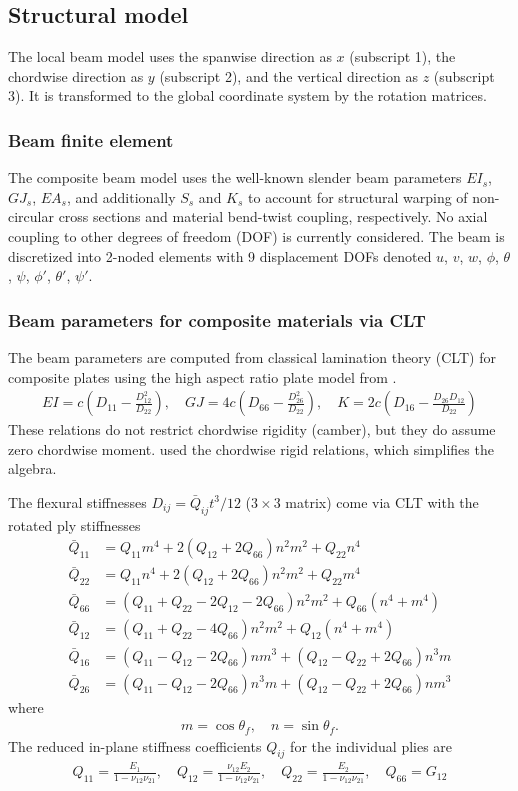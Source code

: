 \documentclass[10pt]{article}
\newcommand{\be}{\begin{eqnarray}}
\newcommand{\ee}{\end{eqnarray}}
\begin{document}
\subsection{Structural model}
% 
The local beam model uses the spanwise direction as $x$ (subscript 1), the chordwise direction as $y$ (subscript 2), and the vertical direction as $z$ (subscript 3).
It is transformed to the global coordinate system by the rotation matrices.
\subsubsection{Beam finite element}
% 
The composite beam model uses the well-known slender beam parameters $EI_s$, $GJ_s$, $EA_s$, and additionally $S_s$ and $K_s$ to account for structural warping of non-circular cross sections and material bend-twist coupling, respectively.
No axial coupling to other degrees of freedom (DOF) is currently considered.
The beam is discretized into 2-noded elements with 9 displacement DOFs denoted $u$, $v$, $w$, $\phi$, $\theta$, $\psi$, $\phi'$, $\theta'$, $\psi'$.
% 
\subsubsection{Beam parameters for composite materials via CLT}
% 
The beam parameters are computed from classical lamination theory (CLT) for composite plates using the high aspect ratio plate model from \citet{Weisshaar1985}.
\be
EI = c\left( D_{11} - \frac{D_{12}^2}{D_{22}}\right)      , \quad
GJ = 4c \left(D_{66} - \frac{D_{26}^2}{D_{22}}\right)     , \quad
K  = 2c \left(D_{16} - \frac{D_{26}D_{12}}{D_{22}}\right)
\ee
These relations do not restrict chordwise rigidity (camber), but they do assume zero chordwise moment.
\citet{LOTTATI1985} used the chordwise rigid relations, which simplifies the algebra.

The flexural stiffnesses $D_{ij} = \bar{Q}_{ij} t^3 / 12$ ($3\times3$ matrix) come via CLT with the rotated ply stiffnesses
\begin{align}
	\bar{Q}_{11} & = Q_{11}m^4 + 2\left( Q_{12}+2Q_{66}\right)n^2m^2 + Q_{22}n^4                               \\
	\bar{Q}_{22} & = Q_{11}n^4+2\left( Q_{12} + 2Q_{66}\right)n^2m^2 + Q_{22}m^4                               \\
	\bar{Q}_{66} & = \left(Q_{11} +Q_{22} - 2Q_{12}-2Q_{66}\right)n^2m^2 + Q_{66}\left( n^4 + m^4 \right)      \\
	\bar{Q}_{12} & = \left(Q_{11} +Q_{22} - 4Q_{66}\right)n^2 m^2 + Q_{12}\left( n^4 + m^4 \right)             \\
	\bar{Q}_{16} & = \left(Q_{11} - Q_{12} - 2Q_{66}\right)n m^3 + \left(Q_{12} - Q_{22} + 2Q_{66}\right) n^3 m \\
	\bar{Q}_{26} & = \left(Q_{11} - Q_{12} - 2Q_{66}\right)n^3 m + \left(Q_{12} - Q_{22} + 2Q_{66}\right) n m^3
\end{align}
where
\be
m= \cos\theta_f,
\quad
n= \sin\theta_f.
\ee
%
The reduced in-plane stiffness coefficients $Q_{ij}$ for the individual plies are
%
\be
Q_{11} = \frac{E_1}{1-\nu_{12}\nu_{21}}, \quad
Q_{12} = \frac{\nu_{12} E_2}{1-\nu_{12}\nu_{21}}, \quad
Q_{22} = \frac{E_2}{1-\nu_{12}\nu_{21}}, \quad
Q_{66} = G_{12}
\ee
\end{document}
